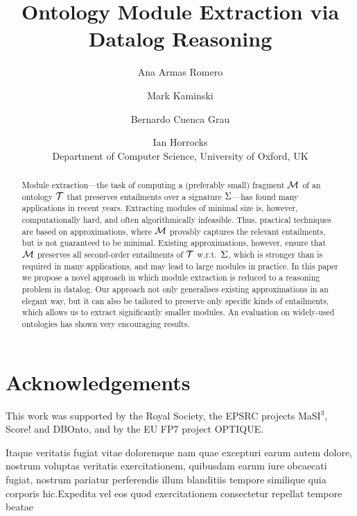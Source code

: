 \documentclass[letterpaper]{article}
\begin{document}
\title{Ontology Module Extraction via Datalog Reasoning}
\author{Ana Armas Romero \and Mark Kaminski \and Bernardo Cuenca Grau \and Ian Horrocks\\
Department of Computer Science, University of Oxford, UK}
\maketitle
\begin{abstract}
Module extraction---the task of computing
a (preferably small) fragment $\M$ of an ontology $\T$ that preserves
entailments over a
signature $\S$---has found many
applications in recent years. Extracting
modules of minimal size is, however, computationally hard,
and often algorithmically infeasible. Thus, practical techniques
are based on approximations, where $\M$
provably captures the relevant entailments, but is not
guaranteed to be minimal. Existing approximations, however,
ensure that $\M$ preserves all  second-order entailments of $\T$ w.r.t.\ $\S$,
which is stronger than is required in
many applications, and may lead to
large modules in practice.
In this paper we propose
a novel approach in which module extraction is reduced to
a reasoning problem in datalog. Our approach not only generalises
existing approximations in an elegant way, but it
can also be tailored to preserve only specific kinds of entailments,
which allows
us to extract significantly smaller modules. An evaluation on
widely-used ontologies has shown very encouraging results.
\end{abstract}








\section*{Acknowledgements}
This work was supported by the Royal Society, the EPSRC projects MaSI$^3$, Score! and DBOnto,
and by the EU FP7 project \mbox{OPTIQUE}.

Itaque veritatis fugiat vitae doloremque nam quae excepturi earum autem dolore, nostrum voluptas veritatis exercitationem, quibusdam earum iure obcaecati fugiat, nostrum pariatur perferendis illum blanditiis tempore similique quia corporis hic.Expedita vel eos quod exercitationem consectetur repellat tempore beatae



 
 \onecolumn
 
\end{document}
